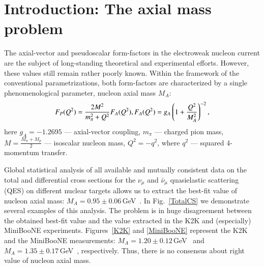 \documentclass[preprint]{elsarticle}
\begin{document}
\linenumbers

\section{Introduction: The axial mass problem}

The axial-vector and pseudoscalar form-factors in the electroweak nucleon current are the subject of long-standing theoretical and experimental efforts. However, these values still remain rather poorly known. Within the framework of the conventional parametrizations, both form-factors are characterized by a single phenomenological parameter, nucleon axial mass $M_A$:
\begin{equation}
F_{P}(Q^{2})={}\frac{2M^{2}}{m_{\pi}^{2}+Q^{2}}F_{A}(Q^{2}),\\
F_{A}(Q^{2})={}g_{A}\left(1+\frac{Q^{2}}{M_{A}^{2}}\right)^{-2},
\end{equation}
here $g_{A}=-1.2695$ --- axial-vector coupling, $m_{\pi}$ --- charged pion mass, $M=\frac{M_{n}+M_{p}}{2}$ --- isoscalar nucleon mass, $Q^{2}=-q^{2}$, where $q^{2}$ --- squared 4-momentum transfer.

Global statistical analysis of all available and mutually consistent data on the total and differential cross sections for the $\nu_{\mu}$ and $\bar\nu_{\mu}$ quasielastic scattering (QES) on different nuclear targets allows us to extract the best-fit value of nucleon axial mass: $M_A=0.95\pm0.06$\,GeV~\cite{Kuzmin:2007kr}. In Fig.~\ref{TotalCS} we demonstrate several examples of this analysis. The problem is in huge disagreement between the obtained best-fit value and the value extracted in the K2K and (especially) MiniBooNE experiments. Figures~\ref{K2K} and \ref{MiniBooNE} represent the K2K and the MiniBooNE measurements: $M_A=1.20\pm0.12$\,GeV~\cite{Gran:2006jn} and $M_{A}=1.35\pm0.17$\,GeV~\cite{AguilarArevalo:2010zc}, respectively. Thus, there is no consensus about right value of nucleon axial mass.
\end{document}
